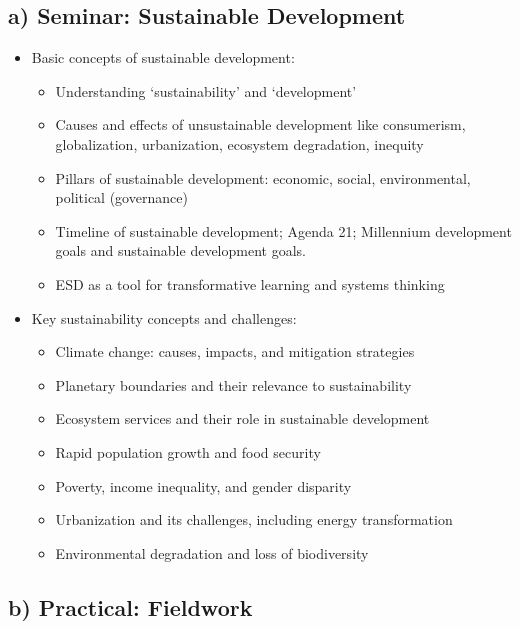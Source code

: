 \documentclass[
  letterpaper,
  10pt,
  openany]{book}
\providecommand{\tightlist}{%
  \setlength{\itemsep}{0pt}\setlength{\parskip}{0pt}}\usepackage{longtable,booktabs,array}
\begin{document}
\subsection*{a) Seminar: Sustainable
Development}\label{a-seminar-sustainable-development}

\begin{itemize}
\tightlist
\item
  Basic concepts of sustainable development:

  \begin{itemize}
  \tightlist
  \item
    Understanding `sustainability' and `development'
  \item
    Causes and effects of unsustainable development like consumerism,
    globalization, urbanization, ecosystem degradation, inequity
  \item
    Pillars of sustainable development: economic, social, environmental,
    political (governance)
  \item
    Timeline of sustainable development; Agenda 21; Millennium
    development goals and sustainable development goals.
  \item
    ESD as a tool for transformative learning and systems thinking
  \end{itemize}
\item
  Key sustainability concepts and challenges:

  \begin{itemize}
  \tightlist
  \item
    Climate change: causes, impacts, and mitigation strategies
  \item
    Planetary boundaries and their relevance to sustainability
  \item
    Ecosystem services and their role in sustainable development
  \item
    Rapid population growth and food security
  \item
    Poverty, income inequality, and gender disparity
  \item
    Urbanization and its challenges, including energy transformation
  \item
    Environmental degradation and loss of biodiversity
  \end{itemize}
\end{itemize}

\subsection*{b) Practical: Fieldwork}\label{b-practical-fieldwork}
\end{document}
